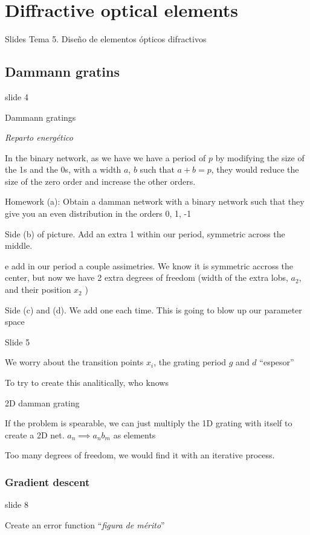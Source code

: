 \documentclass[../main/main.tex]{subfiles}
\begin{document}
\chapter{Diffractive optical elements}

Slides Tema 5. Diseño de elementos ópticos difractivos

\section{Dammann gratins}

slide 4

Dammann gratings

\emph{Reparto energético}

In the binary network, as we have we have a period of $p$ by modifying the size of the 1s and the 0s, with a width $a$, $b$ such that $a+b=p$, they would reduce the size of the zero order and increase the other orders.


Homework (a): Obtain a damman  network with a binary network such that they give you an even distribution in the orders 0, 1, -1


Side (b) of picture. Add an extra 1 within our period, symmetric across the middle.

e add in our period a couple assimetries. We know it is symmetric accross the center, but now we have 2 extra degrees of freedom (width of the extra lobs, $a_2$, and their position $x_2$ )

Side (c) and (d). We add one each time. This is going to blow up our parameter space

Slide 5

We worry about the transition points $x_i$, the grating period $g$ and $d$ ``espesor''

To try to create this analitically, who knows

2D damman grating

If the problem is spearable, we can just multiply the 1D grating with itself to create a 2D net. $a_n \implies a_n b_m$ as elements

Too many degrees of freedom, we would find it with an iterative process.


\subsection{Gradient descent}

slide 8

Create an error function ``\emph{figura de mérito}''
\end{document}
